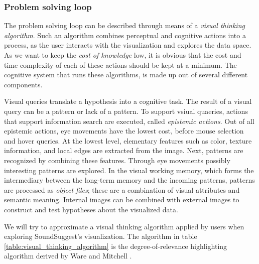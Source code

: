 


\subsubsection{Problem solving loop}\label{subsubsection:problem_solving_loop}

The problem solving loop can be described through means of a \emph{visual thinking algorithm}\cite{ware:2004}. Such an algorithm combines perceptual and cognitive actions into a process, as the user interacts with the visualization and explores the data space. As we want to keep the \emph{cost of knowledge} low, it is obvious that the cost and time complexity of each of these actions should be kept at a minimum. The cognitive system that runs these algorithms, is made up out of several different components\cite{ware:2004}.

Visual queries translate a hypothesis into a cognitive task. The result of a visual query can be a pattern or lack of a pattern. To support vsiual quaeries, actions that support information search are executed, called \emph{epistemic actions}. Out of all epistemic actions, eye movements have the lowest cost, before mouse selection and hover queries. At the lowest level, elementary features such as color, texture information, and local edges are extracted from the image. Next, patterns are recognized by combining these features. Through eye movements possibly interesting patterns are explored. In the visual working memory, which forms the intermediary between the long-term memory and the incoming patterns, patterns are processed as \emph{object files}; these are a combination of visual attributes and semantic meaning. Internal images can be combined with external images to construct and test hypotheses about the visualized data\cite{ware:2004}.

We will try to approximate a visual thinking algorithm applied by users when exploring SoundSuggest's visualization. The algorithm in table \ref{table:visual_thinking_algorithm} is the degree-of-relevance highlighting algorithm derived by Ware and Mitchell \cite{ware:2004}.

